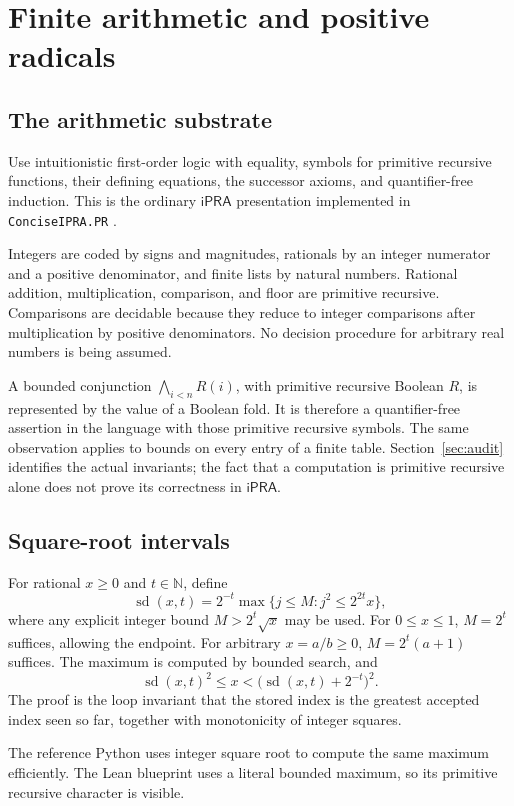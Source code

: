 \documentclass[11pt,a4paper]{article}
\theoremstyle{definition}
\newcommand{\ipra}{\mathsf{iPRA}}
\newcommand{\N}{\mathbb N}
\newcommand{\sd}{\operatorname{sd}}
\begin{document}
\section{Finite arithmetic and positive radicals}\label{sec:arithmetic}
\subsection{The arithmetic substrate}
Use intuitionistic first-order logic with equality, symbols for
primitive recursive functions, their defining equations, the successor
axioms, and quantifier-free induction. This is the ordinary
\(\ipra\) presentation implemented in \texttt{ConciseIPRA.PR}
\cite{proveit-pr}.

Integers are coded by signs and magnitudes, rationals by an integer
numerator and a positive denominator, and finite lists by natural
numbers. Rational addition, multiplication, comparison, and floor are
primitive recursive. Comparisons are decidable because they reduce to
integer comparisons after multiplication by positive denominators.
No decision procedure for arbitrary real numbers is being assumed.

A bounded conjunction
\(\bigwedge_{i<n}R(i)\), with primitive recursive Boolean \(R\), is
represented by the value of a Boolean fold. It is therefore a
quantifier-free assertion in the language with those primitive recursive
symbols. The same observation applies to bounds on every entry of a
finite table. Section~\ref{sec:audit} identifies the actual invariants;
the fact that a computation is primitive recursive alone does not prove
its correctness in \(\ipra\).

\subsection{Square-root intervals}
For rational \(x\ge0\) and \(t\in\N\), define
\[
 \sd(x,t)=2^{-t}\max\{j\le M:j^2\le2^{2t}x\},
 \tag{2.1}\label{eq:sd}
\]
where any explicit integer bound \(M>2^t\sqrt{x}\) may be used.
For \(0\le x\le1\), \(M=2^t\) suffices, allowing the endpoint.
For arbitrary \(x=a/b\ge0\), \(M=2^t(a+1)\) suffices.
The maximum is computed by bounded search, and
\[
 \sd(x,t)^2\le x<\bigl(\sd(x,t)+2^{-t}\bigr)^2.
 \tag{2.2}\label{eq:sdbracket}
\]
The proof is the loop invariant that the stored index is the greatest
accepted index seen so far, together with monotonicity of integer squares.

The reference Python uses integer square root to compute the same
maximum efficiently. The Lean blueprint uses a literal bounded maximum,
so its primitive recursive character is visible.
\end{document}
